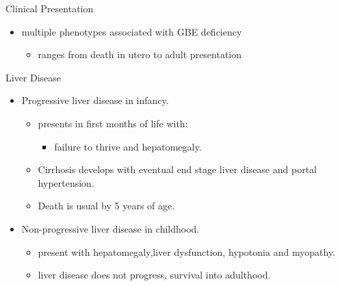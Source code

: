\documentclass[presentation, smaller]{beamer}
\begin{document}
\begin{frame}[label={sec:org2e6f764}]{Clinical Presentation}
\begin{itemize}
\item multiple phenotypes associated with GBE deficiency
\begin{itemize}
\item ranges from death in utero to adult presentation
\end{itemize}
\end{itemize}

\begin{block}{Liver Disease}
\begin{itemize}
\item Progressive liver disease in infancy.
\begin{itemize}
\item presents in first months of life with:
\begin{itemize}
\item failure to thrive and hepatomegaly.
\end{itemize}
\item Cirrhosis develops with eventual end stage liver disease and portal hypertension.
\item Death is usual by 5 years of age.
\end{itemize}
\item Non-progressive liver disease in childhood.
\begin{itemize}
\item present with hepatomegaly,liver dysfunction, hypotonia and
myopathy.
\item liver disease does not progress, survival into adulthood.
\end{itemize}
\end{itemize}
\end{block}
\end{frame}
\end{document}
